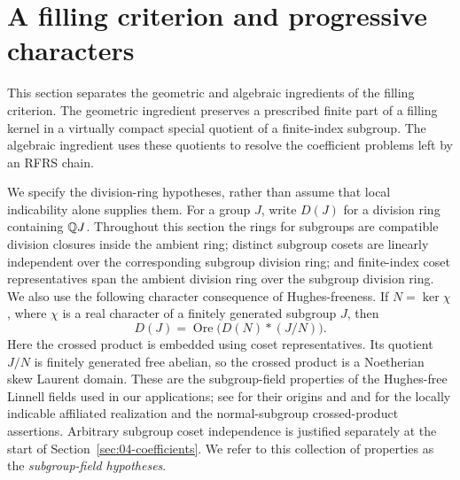\section{A filling criterion and progressive characters}\label{sec:01-filling}

This section separates the geometric and algebraic ingredients of the filling
criterion.  The geometric ingredient preserves a prescribed finite part of a
filling kernel in a virtually compact special quotient of a finite-index
subgroup.  The algebraic ingredient uses these quotients to resolve the
coefficient problems left by an RFRS chain.

We specify the division-ring hypotheses, rather than assume that local
indicability alone supplies them.  For a group \(J\), write \(D(J)\) for a
division ring containing \(\mathbb Q J\).  Throughout this section the rings for
subgroups are compatible division closures inside the ambient ring; distinct
subgroup cosets are linearly independent over the corresponding subgroup
division ring; and finite-index coset representatives span the ambient
division ring over the subgroup division ring.  We also use the following
character consequence of Hughes-freeness.  If \(N=\ker\chi\), where \(\chi\)
is a real character of a finitely generated subgroup \(J\), then
\begin{equation}
 D(J)=\operatorname{Ore}\bigl(D(N)*(J/N)\bigr).
 \label{fill:field}
\end{equation}
Here the crossed product is embedded using coset representatives.  Its
quotient \(J/N\) is finitely generated free abelian, so the crossed product is
a Noetherian skew Laurent domain.  These are the subgroup-field properties
of the Hughes-free Linnell fields used in our applications; see
\cite{Hughes1970,Linnell1993} for their origins and
\cite[Corollaries~6.2--6.3]{JaikinLopezAlvarez2020} and
\cite[Section~2.3 and Proposition~2.2]{JaikinUniversality2021} for the
locally indicable affiliated realization and the normal-subgroup
crossed-product assertions. Arbitrary subgroup coset independence is
justified separately at the start of Section~\ref{sec:04-coefficients}.
We refer to this collection of properties as
the \emph{subgroup-field hypotheses}.

